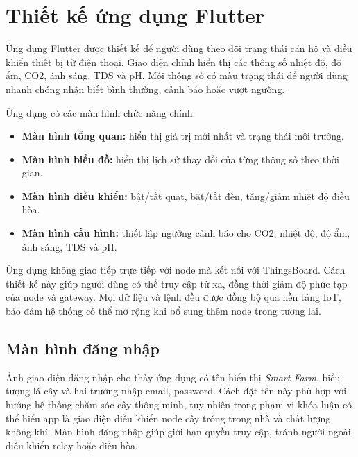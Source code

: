 \section{Thiết kế ứng dụng Flutter}
Ứng dụng Flutter được thiết kế để người dùng theo dõi trạng thái căn hộ và điều khiển thiết bị từ điện thoại. Giao diện chính hiển thị các thông số nhiệt độ, độ ẩm, CO2, ánh sáng, TDS và pH. Mỗi thông số có màu trạng thái để người dùng nhanh chóng nhận biết bình thường, cảnh báo hoặc vượt ngưỡng.

Ứng dụng có các màn hình chức năng chính:
\begin{itemize}
    \item \textbf{Màn hình tổng quan:} hiển thị giá trị mới nhất và trạng thái môi trường.
    \item \textbf{Màn hình biểu đồ:} hiển thị lịch sử thay đổi của từng thông số theo thời gian.
    \item \textbf{Màn hình điều khiển:} bật/tắt quạt, bật/tắt đèn, tăng/giảm nhiệt độ điều hòa.
    \item \textbf{Màn hình cấu hình:} thiết lập ngưỡng cảnh báo cho CO2, nhiệt độ, độ ẩm, ánh sáng, TDS và pH.
\end{itemize}

Ứng dụng không giao tiếp trực tiếp với node mà kết nối với ThingsBoard. Cách thiết kế này giúp người dùng có thể truy cập từ xa, đồng thời giảm độ phức tạp của node và gateway. Mọi dữ liệu và lệnh đều được đồng bộ qua nền tảng IoT, bảo đảm hệ thống có thể mở rộng khi bổ sung thêm node trong tương lai.

\subsection{Màn hình đăng nhập}
Ảnh giao diện đăng nhập cho thấy ứng dụng có tên hiển thị \textit{Smart Farm}, biểu tượng lá cây và hai trường nhập email, password. Cách đặt tên này phù hợp với hướng hệ thống chăm sóc cây thông minh, tuy nhiên trong phạm vi khóa luận có thể hiểu app là giao diện điều khiển node cây trồng trong nhà và chất lượng không khí. Màn hình đăng nhập giúp giới hạn quyền truy cập, tránh người ngoài điều khiển relay hoặc điều hòa.

